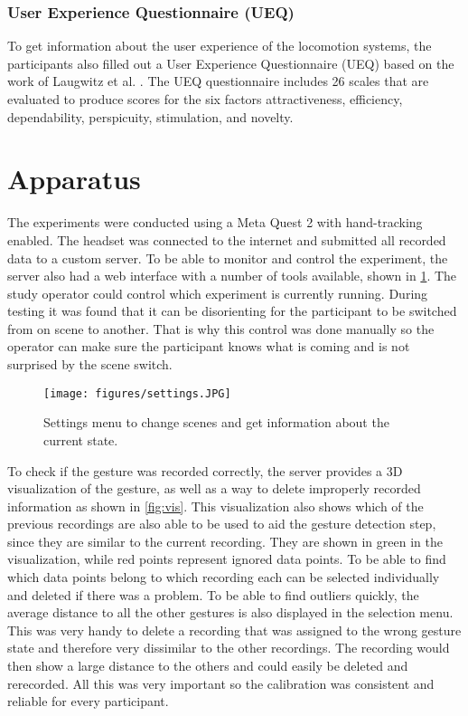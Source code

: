 \subsubsection{User Experience Questionnaire (UEQ)}
To get information about the user experience of the locomotion systems, the participants also filled out a User Experience Questionnaire (UEQ) based on the work of Laugwitz et al. \cite{Laugwitz2008}. The UEQ questionnaire includes 26 scales that are evaluated to produce scores for the six factors attractiveness, efficiency, dependability, perspicuity, stimulation, and novelty.

\section{Apparatus}

The experiments were conducted using a Meta Quest 2 with hand-tracking enabled. The headset was connected to the internet and submitted all recorded data to a custom server. To be able to monitor and control the experiment, the server also had a web interface with a number of tools available, shown in \ref{fig:settings}. The study operator could control which experiment is currently running. During testing it was found that it can be disorienting for the participant to be switched from on scene to another. That is why this control was done manually so the operator can make sure the participant knows what is coming and is not surprised by the scene switch.

\begin{figure}[!ht]
    \centering
    \texttt{[image: figures/settings.JPG]}
    \caption{Settings menu to change scenes and get information about the current state.}
    \label{fig:settings}
\end{figure}

To check if the gesture was recorded correctly, the server provides a 3D visualization of the gesture, as well as a way to delete improperly recorded information as shown in \ref{fig:vis}. This visualization also shows which of the previous recordings are also able to be used to aid the gesture detection step, since they are similar to the current recording. They are shown in green in the visualization, while red points represent ignored data points. To be able to find which data points belong to which recording each can be selected individually and deleted if there was a problem. To be able to find outliers quickly, the average distance to all the other gestures is also displayed in the selection menu. This was very handy to delete a recording that was assigned to the wrong gesture state and therefore very dissimilar to the other recordings. The recording would then show a large distance to the others and could easily be deleted and rerecorded. All this was very important so the calibration was consistent and reliable for every participant.

